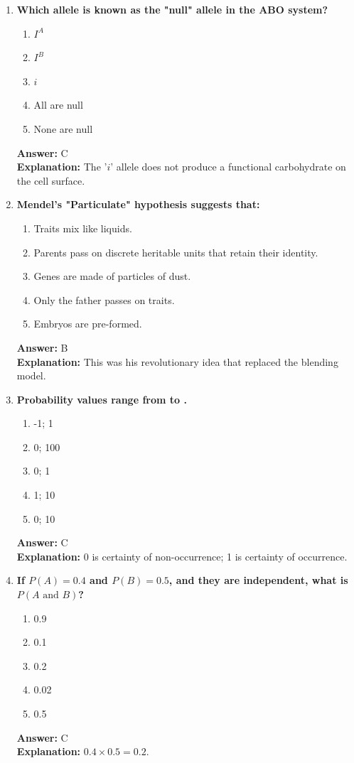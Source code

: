 \documentclass[11pt, a4paper]{article}
\begin{document}
\begin{enumerate}[leftmargin=*, label=\arabic*.]
\item \textbf{Which allele is known as the "null" allele in the ABO system?}
\begin{enumerate}[label=\Alph*.]
\item $I^A$
\item $I^B$
\item $i$
\item All are null
\item None are null
\end{enumerate}
\textbf{Answer:} C \\
\textbf{Explanation:} The '$i$' allele does not produce a functional carbohydrate on the cell surface.

\item \textbf{Mendel’s "Particulate" hypothesis suggests that:}
\begin{enumerate}[label=\Alph*.]
\item Traits mix like liquids.
\item Parents pass on discrete heritable units that retain their identity.
\item Genes are made of particles of dust.
\item Only the father passes on traits.
\item Embryos are pre-formed.
\end{enumerate}
\textbf{Answer:} B \\
\textbf{Explanation:} This was his revolutionary idea that replaced the blending model.

\item \textbf{Probability values range from \underline{\hspace{1cm}} to \underline{\hspace{1cm}}.}
\begin{enumerate}[label=\Alph*.]
\item -1; 1
\item 0; 100
\item 0; 1
\item 1; 10
\item 0; 10
\end{enumerate}
\textbf{Answer:} C \\
\textbf{Explanation:} 0 is certainty of non-occurrence; 1 is certainty of occurrence.

\item \textbf{If $P(A) = 0.4$ and $P(B) = 0.5$, and they are independent, what is $P(A \text{ and } B)$?}
\begin{enumerate}[label=\Alph*.]
\item 0.9
\item 0.1
\item 0.2
\item 0.02
\item 0.5
\end{enumerate}
\textbf{Answer:} C \\
\textbf{Explanation:} $0.4 \times 0.5 = 0.2$.


\end{enumerate}
\end{document}
